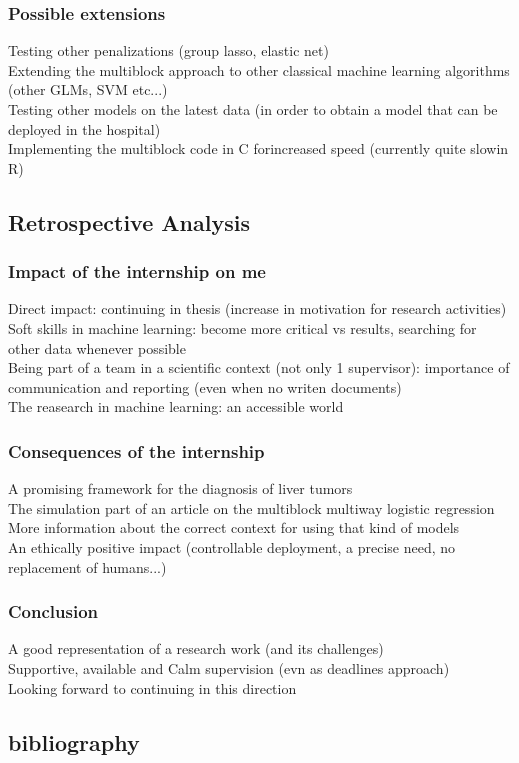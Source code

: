 \documentclass{beamer}
\begin{document}
\begin{frame}
    \frametitle{Possible extensions}
    Testing other penalizations (group lasso, elastic net)\\[10 pt]
    Extending the multiblock approach to other classical machine learning algorithms (other GLMs, SVM etc...)\\[10 pt]
    Testing other models on the latest data (in order to obtain a model that can be deployed in the hospital)\\[10 pt]
    Implementing the multiblock code in C forincreased speed (currently quite slowin R)
\end{frame}

\begin{frame}
    \section{Retrospective Analysis}
\end{frame}

\begin{frame}
    \frametitle{Impact of the internship on me}
    Direct impact: continuing in thesis (increase in motivation for research activities)\\[10 pt]
    Soft skills in machine learning: become more critical vs results, searching for other data whenever possible\\[10 pt]
    Being part of a team in a scientific context (not only 1 supervisor): importance of communication and reporting (even when no writen documents)\\[10 pt]
    The reasearch in machine learning: an accessible world
\end{frame}


\begin{frame}
    \frametitle{Consequences of the internship}
    A promising framework for the diagnosis of liver tumors\\[10 pt]
    The simulation part of an article on the multiblock multiway logistic regression\\[10 pt]
    More information about the correct context for using that kind of models\\[10 pt]
    An ethically positive impact (controllable deployment, a precise need, no replacement of humans...)
    
\end{frame}

\begin{frame}
    \frametitle{Conclusion}
    A good representation of a research work (and its challenges)\\[10 pt]
    Supportive, available and Calm supervision (evn as deadlines approach)\\[10 pt]
    Looking forward to continuing in this direction
\end{frame}

\begin{frame}
\section*{bibliography}
\end{frame}


\begin{frame}[allowframebreaks] 
    
     
    \end{frame}
\end{document}
